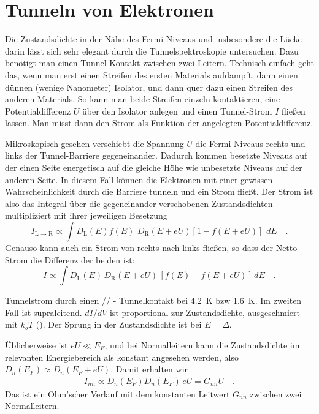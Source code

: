 \section{Tunneln von Elektronen}

Die Zustandsdichte in der Nähe des Fermi-Niveaus und insbesondere die Lücke darin lässt sich sehr elegant durch die Tunnelspektroskopie untersuchen. Dazu benötigt man einen Tunnel-Kontakt zwischen zwei Leitern. Technisch einfach geht das, wenn man erst einen Streifen des ersten Materials aufdampft, dann einen dünnen (wenige Nanometer) Isolator, und dann quer dazu einen Streifen  des anderen Materials. So kann man beide Streifen einzeln kontaktieren, eine Potentialdifferenz $U$ über den Isolator anlegen und einen Tunnel-Strom $I$ fließen lassen. Man misst dann den Strom als Funktion der angelegten Potentialdifferenz.

Mikroskopisch gesehen verschiebt die Spannung $U$ die Fermi-Niveaus rechts und links der Tunnel-Barriere gegeneinander. Dadurch kommen besetzte Niveaus auf der einen Seite energetisch auf die gleiche Höhe wie unbesetzte Niveaus auf der anderen Seite. In diesem Fall können die Elektronen mit einer gewissen Wahrscheinlichkeit durch die Barriere tunneln und ein Strom fließt. Der Strom ist also das Integral über die gegeneinander verschobenen Zustandsdichten multipliziert mit ihrer jeweiligen Besetzung
\begin{equation}
    I_\text{L $\rightarrow$ R} \propto \int D_\text{L}(E) f(E) \, \, D_\text{R}(E + e U) [1 - f(E + e U)] \, \, dE \quad .
\end{equation}
Genauso kann auch ein Strom von rechts nach links fließen, so dass der Netto-Strom die Differenz der beiden ist:
\begin{equation}
    I \propto \int D_\text{L}(E) \, D_\text{R}(E + e U)  \, [f(E) - f(E + e U)] \, dE \quad .
\end{equation}

\begin{marginfigure}
    \caption{Tunnelstrom durch einen // - Tunnelkontakt bei 4.2~K bzw 1.6~K. Im zweiten Fall ist  supraleitend. $dI/dV$ ist proportional zur Zustandsdichte, ausgeschmiert mit $k_b T$
(\cite{Giaever1960}). Der Sprung in der Zustandsdichte ist bei $E=\Delta$.}
\end{marginfigure}
  

Üblicherweise ist $eU \ll E_F$, und bei Normalleitern kann die Zustandsdichte  im relevanten Energiebereich als konstant angesehen werden, also $D_{n}(E_F)  \approx  D_{n}(E_F + e U)$. Damit erhalten wir
\begin{eqnarray}
    I_{nn} \propto D_{n}(E_F)  D_{n}(E_F) \, e U = G_{nn} U \quad .
\end{eqnarray}
Das ist ein Ohm'scher Verlauf mit dem konstanten Leitwert $G_{nn}$ zwischen zwei Normalleitern.

